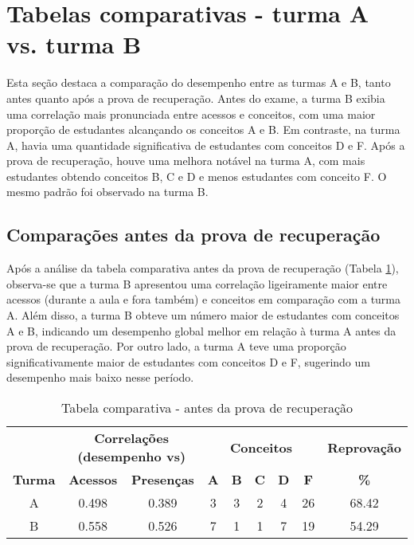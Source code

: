 
\section{Tabelas comparativas - turma A vs. turma B}

Esta seção destaca a comparação do desempenho entre as turmas A e B, tanto antes quanto após a prova de recuperação. Antes do exame, a turma B exibia uma correlação mais pronunciada entre acessos e conceitos, com uma maior proporção de estudantes alcançando os conceitos A e B. Em contraste, na turma A, havia uma quantidade significativa de estudantes com conceitos D e F. Após a prova de recuperação, houve uma melhora notável na turma A, com mais estudantes obtendo conceitos B, C e D e menos estudantes com conceito F. O mesmo padrão foi observado na turma B.

\subsection{Comparações antes da prova de recuperação}

Após a análise da tabela comparativa antes da prova de recuperação (Tabela \ref{tab:antes-recuperacao}), observa-se que a turma B apresentou uma correlação ligeiramente maior entre acessos (durante a aula e fora também) e conceitos em comparação com a turma A. Além disso, a turma B obteve um número maior de estudantes com conceitos A e B, indicando um desempenho global melhor em relação à turma A antes da prova de recuperação. Por outro lado, a turma A teve uma proporção significativamente maior de estudantes com conceitos D e F, sugerindo um desempenho mais baixo nesse período.

\begin{table}[htbp]
    \centering
    \caption{Tabela comparativa - antes da prova de recuperação}
    \label{tab:antes-recuperacao}
    \begin{tabular}{|c|c|c|c|c|c|c|c|c|}
      \hline
      \rowcolor[HTML]{EFEFEF} 
      & \multicolumn{2}{c|}{\cellcolor[HTML]{C0C0C0}\textbf{Correlações (desempenho vs)}} & \multicolumn{5}{c|}{\cellcolor[HTML]{C0C0C0}\textbf{Conceitos}} & \cellcolor[HTML]{C0C0C0}\textbf{Reprovação} \\
      \cline{2-3} \cline{4-8} \cline{9-9}
      \rowcolor[HTML]{EFEFEF} 
      \textbf{Turma} & \textbf{Acessos} & \textbf{Presenças} & \textbf{A} & \textbf{B} & \textbf{C} & \textbf{D} & \textbf{F} & \textbf{\%} \\
      \hline
      A & 0.498 & 0.389 & 3 & 3 & 2 & 4 & 26 & 68.42 \\
      \hline
      B & 0.558 & 0.526 & 7 & 1 & 1 & 7 & 19 & 54.29 \\
      \hline
    \end{tabular}
\end{table}

